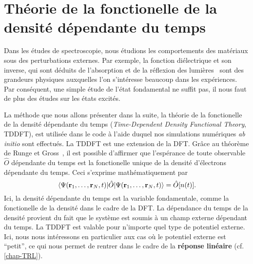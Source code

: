 \section[TDDFT]{Théorie de la fonctionelle de la densité dépendante du temps}
\label{sec-TDDFT}
Dans les études de spectroscopie,
nous étudions les comportements des matériaux sous des perturbations externes.
Par exemple,
la fonction diélectrique et son inverse,
qui sont déduits de l'absorption et de la réflexion des lumières~\cite{Sottile2003}
sont des grandeurs physiques auxquelles l'on s'intéresse beaucoup dans les expériences.
Par conséquent, une simple étude de l'état fondamental ne suffit pas,
il nous faut de plus des études sur les états excités.

La méthode que nous allons présenter dans la suite,
la théorie de la fonctionelle de la densité dépendante du temps
(\textit{Time-Dependent Density Functional Theory}, TDDFT),
est utilisée dans le code à l'aide duquel nos simulations numériques \textit{ab initio} sont effectués.
La TDDFT est une extension de la DFT\@.
Grâce au théorème de Runge et Gross~\cite{Runge1984},
il est possible d'affirmer que l'espérance de toute observable $\hat{O}$ dépendante du temps
est la fonctionelle unique de la densité d'électrons dépendante du temps.
Ceci s'exprime mathématiquement par
\begin{equation}
  \ev{\hat{O}}{\Psi(\vb{r}_1, \ldots, \vb{r}_N, t)} = \hat{O}[n(t)].
\end{equation}
Ici, la densité dépendante du temps est la variable fondamentale,
comme la fonctionelle de la densité dans le cadre de la DFT\@.
La dépendance du temps de la densité provient du fait que le système est soumis à un champ externe dépendant du temps.
La TDDFT est valable pour n'importe quel type de potentiel externe.
Ici, nous nous intéressons en particulier aux cas où le potentiel externe est ``petit'',
ce qui nous permet de rentrer dans le cadre de la \textbf{réponse linéaire} (cf. \cref{chap-TRL}).

